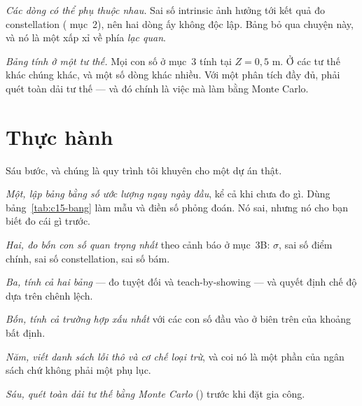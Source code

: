 \documentclass[../../marker.tex]{subfiles}
\begin{document}
\emph{Các dòng có thể phụ thuộc nhau.} Sai số intrinsic ảnh hưởng tới kết quả đo constellation ( mục~2), nên hai dòng ấy không độc lập. Bảng bỏ qua chuyện này, và nó là một xấp xỉ về phía \emph{lạc quan}.

\emph{Bảng tính ở một tư thế.} Mọi con số ở mục~3 tính tại \(Z = 0{,}5\) m. Ở các tư thế khác chúng khác, và một số dòng khác nhiều. Với một phân tích đầy đủ, phải quét toàn dải tư thế --- và đó chính là việc mà  làm bằng Monte Carlo.

\section{Thực hành}

Sáu bước, và chúng là quy trình tôi khuyên cho một dự án thật.

\emph{Một, lập bảng bằng số ước lượng ngay ngày đầu}, kể cả khi chưa đo gì. Dùng bảng~\ref{tab:c15-bang} làm mẫu và điền số phỏng đoán. Nó sai, nhưng nó cho bạn biết đo cái gì trước.

\emph{Hai, đo bốn con số quan trọng nhất} theo cảnh báo ở mục~3B: \(\sigma\), sai số điểm chính, sai số constellation, sai số bám.

\emph{Ba, tính cả hai bảng} --- đo tuyệt đối và teach-by-showing --- và quyết định chế độ dựa trên chênh lệch.

\emph{Bốn, tính cả trường hợp xấu nhất} với các con số đầu vào ở biên trên của khoảng bất định.

\emph{Năm, viết danh sách lỗi thô và cơ chế loại trừ}, và coi nó là một phần của ngân sách chứ không phải một phụ lục.

\emph{Sáu, quét toàn dải tư thế bằng Monte Carlo} () trước khi đặt gia công.
\end{document}
